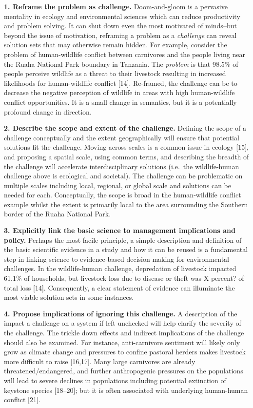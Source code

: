 \documentclass[10pt,letterpaper]{article}
\begin{document}
\textbf{1. Reframe the problem as challenge.} Doom-and-gloom is a
pervasive mentality in ecology and environmental sciences which can
reduce productivity and problem solving. It can shut down even the most
motivated of minds--but beyond the issue of motivation, reframing a
problem as a \emph{challenge} can reveal solution sets that may
otherwise remain hidden. For example, consider the problem of
human-wildlife conflict between carnivores and the people living near
the Ruaha National Park boundary in Tanzania. The \emph{problem} is that
98.5\% of people perceive wildlife as a threat to their livestock
resulting in increased likelihoods for human-wildlife conflict {[}14{]}.
Re-framed, the challenge can be to decrease the negative perception of
wildlife in areas with high human-wildlife conflict opportunities. It is
a small change in semantics, but it is a potentially profound change in
direction.

\textbf{2. Describe the scope and extent of the challenge.} Defining the
scope of a challenge conceptually and the extent geographically will
ensure that potential solutions fit the challenge. Moving across scales
is a common issue in ecology {[}15{]}, and proposing a spatial scale,
using common terms, and describing the breadth of the challenge will
accelerate interdisciplinary solutions (i.e.~the wildlife-human
challenge above is ecological and societal). The challenge can be
problematic on multiple scales including local, regional, or global
scale and solutions can be needed for each. Conceptually, the scope is
broad in the human-wildlife conflict example whilst the extent is
primarily local to the area surrounding the Southern border of the Ruaha
National Park.

\textbf{3. Explicitly link the basic science to management implications
and policy.} Perhaps the most facile principle, a simple description and
definition of the basic scientific evidence in a study and how it can be
reused is a fundamental step in linking science to evidence-based
decision making for environmental challenges. In the wildlife-human
challenge, depredation of livestock impacted 61.1\% of households, but
livestock loss due to disease or theft was X percent? of total loss
{[}14{]}. Consequently, a clear statement of evidence can illuminate the
most viable solution sets in some instances.

\textbf{4. Propose implications of ignoring this challenge.} A
description of the impact a challenge on a system if left unchecked will
help clarify the severity of the challenge. The trickle down effects and
indirect implications of the challenge should also be examined. For
instance, anti-carnivore sentiment will likely only grow as climate
change and pressures to confine pastoral herders makes livestock more
difficult to raise {[}16,17{]}. Many large carnivores are already
threatened/endangered, and further anthropogenic pressures on the
populations will lead to severe declines in populations including
potential extinction of keystone species {[}18--20{]}; but it is often
associated with underlying human-human conflict {[}21{]}.
\end{document}
